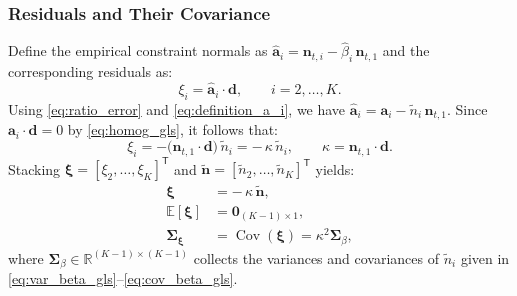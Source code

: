 \documentclass[journal]{IEEEtran}
\begin{document}
\subsubsection{Residuals and Their Covariance}
Define the empirical constraint normals as
\(\hat{\mathbf a}_i = \mathbf n_{t,i} - \hat\beta_i\,\mathbf n_{t,1}\)
and the corresponding residuals as:
\begin{equation}
\xi_i = \hat{\mathbf a}_i\cdot\mathbf d,\qquad i=2,\ldots,K.
\label{eq:residual_def}
\end{equation}
Using \eqref{eq:ratio_error} and \eqref{eq:definition_a_i}, we have
\(
\hat{\mathbf a}_i=\mathbf a_i-\tilde n_i\,\mathbf n_{t,1}
\).
Since \(\mathbf a_i\cdot\mathbf d=0\) by \eqref{eq:homog_gls}, it follows that:
\begin{equation}
\xi_i
= -\bigl(\mathbf n_{t,1}\!\cdot\!\mathbf d\bigr)\,\tilde n_i
= -\,\kappa\,\tilde n_i,
\qquad
\kappa = \mathbf n_{t,1}\!\cdot\!\mathbf d.
\label{eq:residual_scalar}
\end{equation}
Stacking \(\boldsymbol{\xi}=[\xi_2,\ldots,\xi_K]^{\mathsf T}\) and
\(\tilde{\boldsymbol n}=[\tilde n_2,\ldots,\tilde n_K]^{\mathsf T}\) yields:
\begin{equation}
\begin{aligned}
\boldsymbol{\xi} &= -\,\kappa\,\tilde{\boldsymbol n}, \\
\mathbb E[\boldsymbol{\xi}] &= \mathbf{0}_{(K-1)\times 1}, \\
\mathbf \Sigma_{\boldsymbol{\xi}} &= \operatorname{Cov}(\boldsymbol{\xi})
= \kappa^{2}\mathbf\Sigma_{\beta},
\end{aligned}
\label{eq:residual_cov}
\end{equation}
where \(\mathbf\Sigma_{\beta}\in\mathbb R^{(K-1)\times(K-1)}\) collects the variances and covariances of \(\tilde n_i\) given in \eqref{eq:var_beta_gls}–\eqref{eq:cov_beta_gls}. 
\end{document}
